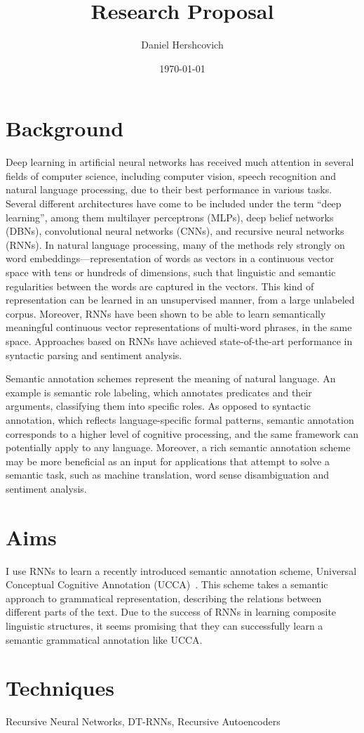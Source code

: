 \documentclass[11pt]{article}
\begin{document}
\title{Research Proposal}
\author{Daniel Hershcovich}
\date{\today}
\maketitle

\section{Background}

Deep learning in artificial neural networks has received much attention in several fields of computer science, including computer vision, speech recognition and natural language processing, due to their best performance in various tasks. Several different architectures have come to be included under the term “deep learning”, among them multilayer perceptrons (MLPs), deep belief networks (DBNs), convolutional neural networks (CNNs), and recursive neural networks (RNNs). In natural language processing, many of the methods rely strongly on word embeddings—representation of words as vectors in a continuous vector space with tens or hundreds of dimensions, such that linguistic and semantic regularities between the words are captured in the vectors. This kind of representation can be learned in an unsupervised manner, from a large unlabeled corpus. Moreover, RNNs have been shown to be able to learn semantically meaningful continuous vector representations of multi-word phrases, in the same space. Approaches based on RNNs have achieved state-of-the-art performance in syntactic parsing and sentiment analysis.

Semantic annotation schemes represent the meaning of natural language. An example is semantic role labeling, which annotates predicates and their arguments, classifying them into specific roles. As opposed to syntactic annotation, which reflects language-specific formal patterns, semantic annotation corresponds to a higher level of cognitive processing, and the same framework can potentially apply to any language. Moreover, a rich semantic annotation scheme may be more beneficial as an input for applications that attempt to solve a semantic task, such as machine translation, word sense disambiguation and sentiment analysis.


\section{Aims}

I use RNNs to learn a recently introduced semantic annotation scheme, Universal Conceptual Cognitive Annotation (UCCA)~\cite{abend2013universal}. This scheme takes a semantic approach to grammatical representation, describing the relations between different parts of the text. Due to the success of RNNs in learning composite linguistic structures, it seems promising that they can successfully learn a semantic grammatical annotation like UCCA.


\section{Techniques}

Recursive Neural Networks, DT-RNNs, Recursive Autoencoders


{}

\end{document}
